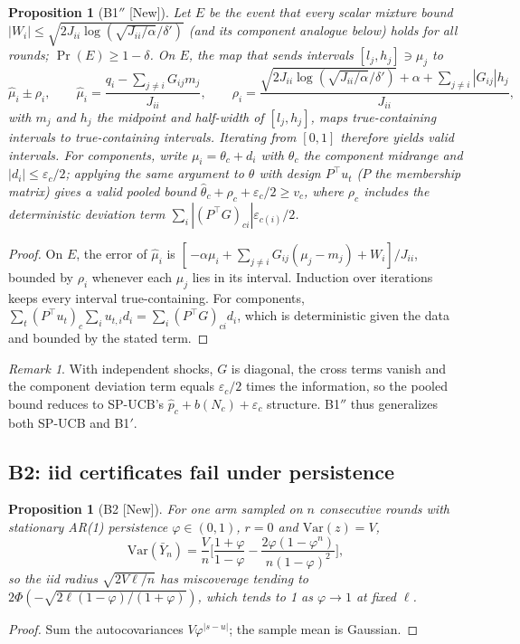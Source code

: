 \documentclass[11pt]{article}
\newtheorem{proposition}[theorem]{Proposition}
\theoremstyle{definition}
\theoremstyle{remark}
\newtheorem{remark}[theorem]{Remark}
\newcommand{\Var}{\mathrm{Var}}
\newcommand{\src}[1]{\textsf{[#1]}}
\begin{document}
\begin{proposition}[B1$''$ \src{New}]\label{prop:b1pp}
Let $E$ be the event that every scalar mixture bound $|W_i|\le\sqrt{2J_{ii}\log(\sqrt{J_{ii}/\alpha}/\delta')}$ (and its component analogue below) holds for all rounds; $\Pr(E)\ge1-\delta$. On $E$, the map that sends intervals $[l_j,h_j]\ni\mu_j$ to
\[
\hat\mu_i\pm\rho_i,\qquad \hat\mu_i=\frac{q_i-\sum_{j\ne i}G_{ij}m_j}{J_{ii}},\qquad
\rho_i=\frac{\sqrt{2J_{ii}\log(\sqrt{J_{ii}/\alpha}/\delta')}+\alpha+\sum_{j\ne i}|G_{ij}|h_j}{J_{ii}},
\]
with $m_j$ and $h_j$ the midpoint and half-width of $[l_j,h_j]$, maps true-containing intervals to true-containing intervals. Iterating from $[0,1]$ therefore yields valid intervals. For components, write $\mu_i=\theta_c+d_i$ with $\theta_c$ the component midrange and $|d_i|\le\varepsilon_c/2$; applying the same argument to $\theta$ with design $P^\top u_t$ ($P$ the membership matrix) gives a valid pooled bound $\hat\theta_c+\rho_c+\varepsilon_c/2\ge v_c$, where $\rho_c$ includes the deterministic deviation term $\sum_i|(P^\top G)_{ci}|\varepsilon_{c(i)}/2$.
\end{proposition}
\begin{proof}
On $E$, the error of $\hat\mu_i$ is $[\,{-\alpha\mu_i}+\sum_{j\ne i}G_{ij}(\mu_j-m_j)+W_i]/J_{ii}$, bounded by $\rho_i$ whenever each $\mu_j$ lies in its interval. Induction over iterations keeps every interval true-containing. For components, $\sum_t(P^\top u_t)_c\sum_iu_{t,i}d_i=\sum_i(P^\top G)_{ci}d_i$, which is deterministic given the data and bounded by the stated term.
\end{proof}

\begin{remark}
With independent shocks, $G$ is diagonal, the cross terms vanish and the component deviation term equals $\varepsilon_c/2$ times the information, so the pooled bound reduces to SP-UCB's $\hat p_c+b(N_c)+\varepsilon_c$ structure. B1$''$ thus generalizes both SP-UCB and B1$'$.
\end{remark}

\subsection{B2: iid certificates fail under persistence}

\begin{proposition}[B2 \src{New}]\label{prop:b2}
For one arm sampled on $n$ consecutive rounds with stationary AR(1) persistence $\varphi\in(0,1)$, $r=0$ and $\Var(z)=V$,
\[
\Var(\bar Y_n)=\frac Vn\Big[\frac{1+\varphi}{1-\varphi}-\frac{2\varphi(1-\varphi^n)}{n(1-\varphi)^2}\Big],
\]
so the iid radius $\sqrt{2V\ell/n}$ has miscoverage tending to $2\Phi(-\sqrt{2\ell(1-\varphi)/(1+\varphi)})$, which tends to 1 as $\varphi\to1$ at fixed $\ell$.
\end{proposition}
\begin{proof}
Sum the autocovariances $V\varphi^{|s-u|}$; the sample mean is Gaussian.
\end{proof}
\end{document}

